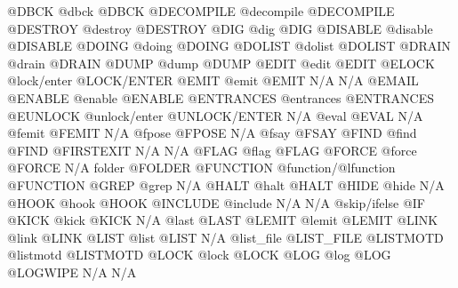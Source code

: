 \documentclass[letterpaper,10pt,english]{sphinxmanual}
\begin{document}
\begin{description}
@DBCK                   @dbck                          @DBCK
@DECOMPILE              @decompile                     @DECOMPILE
@DESTROY                @destroy                       @DESTROY
@DIG                    @dig                           @DIG
@DISABLE                @disable                       @DISABLE
@DOING                  @doing                         @DOING
@DOLIST                 @dolist                        @DOLIST
@DRAIN                  @drain                         @DRAIN
@DUMP                   @dump                          @DUMP
@EDIT                   @edit                          @EDIT
@ELOCK                  @lock/enter                    @LOCK/ENTER
@EMIT                   @emit                          @EMIT
N/A                     N/A                            @EMAIL
@ENABLE                 @enable                        @ENABLE
@ENTRANCES              @entrances                     @ENTRANCES
@EUNLOCK                @unlock/enter                  @UNLOCK/ENTER
N/A                     @eval                          @EVAL
N/A                     @femit                         @FEMIT
N/A                     @fpose                         @FPOSE
N/A                     @fsay                          @FSAY
@FIND                   @find                          @FIND
@FIRSTEXIT              N/A                            N/A
@FLAG                   @flag                          @FLAG
@FORCE                  @force                         @FORCE
N/A                     folder                         @FOLDER
@FUNCTION               @function/@lfunction           @FUNCTION
@GREP                   @grep                          N/A
@HALT                   @halt                          @HALT
@HIDE                   @hide                          N/A
@HOOK                   @hook                          @HOOK
@INCLUDE                @include                       N/A
N/A                     @skip/ifelse                   @IF
@KICK                   @kick                          @KICK
N/A                     @last                          @LAST
@LEMIT                  @lemit                         @LEMIT
@LINK                   @link                          @LINK
@LIST                   @list                          @LIST
N/A                     @list\_file                     @LIST\_FILE
@LISTMOTD               @listmotd                      @LISTMOTD
@LOCK                   @lock                          @LOCK
@LOG                    @log                           @LOG
@LOGWIPE                N/A                            N/A

\end{description}
\end{document}
